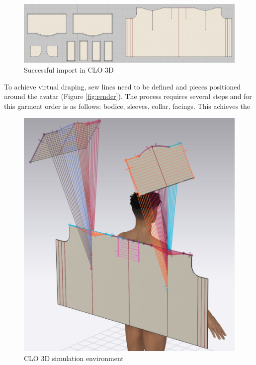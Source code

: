 \begin{figure} [H]
    \centering
    \includegraphics[width = \textwidth]{Images/suc import.png}
    \caption{Successful import in CLO 3D}
    \label{fig:successful import}
\end{figure}

To achieve virtual draping, sew lines need to be defined and pieces positioned around the avatar (Figure \ref{fig:render}). The process requires several steps and for this garment order is as follows: bodice, sleeves, collar, facings.  This achieves the 

\begin{figure} [H]
    \centering
    \includegraphics[width = \textwidth]{Images/sew in CLO.png}
    \caption{CLO 3D simulation environment}
    \label{fig:successful import}
\end{figure}

